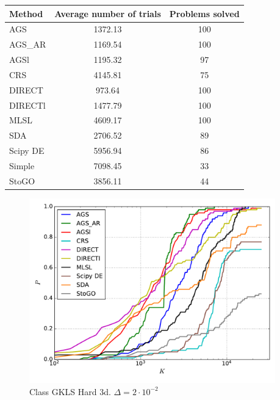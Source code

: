 \documentclass[a4paper]{article}
\begin{document}
\begin{tabular}{lcc}
\hline
 Method   &  Average number of trials  &  Problems solved  \\
\hline
 AGS      &          1372.13           &        100        \\
 AGS\_AR   &          1169.54           &        100        \\
 AGSl     &          1195.32           &        97         \\
 CRS      &          4145.81           &        75         \\
 DIRECT   &           973.64           &        100        \\
 DIRECTl  &          1477.79           &        100        \\
 MLSL     &          4609.17           &        100        \\
 SDA      &          2706.52           &        89         \\
 Scipy DE &          5956.94           &        86         \\
 Simple   &          7098.45           &        33         \\
 StoGO    &          3856.11           &        44         \\
\hline
\end{tabular}
\begin{figure}[H]
  \center
  \includegraphics[width=0.95\textwidth]{../experiments/gklsh3d/cmc.pdf}
  \caption{Class GKLS Hard 3d. $\Delta=2\cdot10^{-2}$}
\end{figure}
\end{document}
